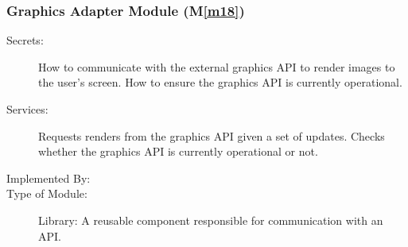 \documentclass[12pt, titlepage]{article}
\newcommand{\mref}[1]{M\ref{#1}}
\begin{document}
\subsubsection{Graphics Adapter Module (\mref{m18})}

\begin{description}
\item[Secrets:] How to communicate with the external graphics API to render images to the user's screen. How to ensure the graphics API is currently operational.
\item[Services:] Requests renders from the graphics API given a set of updates. Checks whether the graphics API is currently operational or not.
\item[Implemented By:] \progname{}
\item[Type of Module:] Library: A reusable component responsible for communication with an API.
\end{description}

\end{document}

